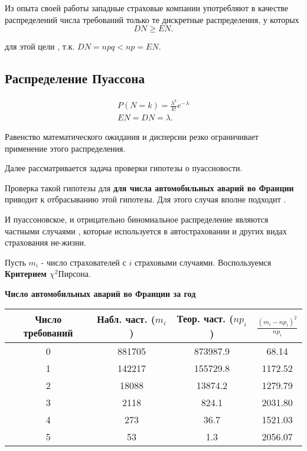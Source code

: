 \begin{fact}
	Из опыта своей работы западные страховые компании употребляют в качестве распределений числа требований только те дискретные распределения, у которых
	\[ DN \geq EN. \]
\end{fact}

 для этой цели , т.к. $DN = npq < np = EN.$ 

\subsection{Распределение Пуассона} %
\begin{gather*}
	P(N=k) = \frac{\lambda^k}{k!}e^{-\lambda} \\
	EN = DN = \lambda.
\end{gather*}

Равенство математического ожидания и дисперсии резко ограничивает применение этого распределения.

Далее рассматривается задача проверки гипотезы о пуассновости.

Проверка такой гипотезы для \textbf{ для числа автомобильных аварий во Франции } приводит к отбрасыванию этой гипотезы. Для этого случая вполне подходит . 

И пуассоновское, и отрицательно биномиальное распределение являются частными случаями , которые используется в автостраховании и других видах страхования не-жизни.

Пусть $m_i$ - число страхователей с $i$ страховыми случаями. Воспользуемся \textbf{ Критерием $\chi^2 Пирсона$}.
\begin{center}
\textbf{Число автомобильных аварий во Франции за год}
	\begin{tabular}{ |c|c|c|c|} 
	 \hline
	 Число требований & Набл. част. ($m_i$) & Теор. част. ($np_i$) & $\frac{(m_i-np_i)^2}{np_i}$ \\
	 \hline 
	 0 & 881705 & 873987.9 & 68.14 \\ 
	 \hline
	 1 & 142217 & 155729.8 & 1172.52\\ 
	 \hline
	 2 & 18088 & 13874.2 & 1279.79\\ 
	 \hline
	 3 & 2118 & 824.1 & 2031.80\\ 
	 \hline
	 4 & 273 & 36.7 & 1521.03\\ 
	 \hline
	 5 & 53 & 1.3 & 2056.07\\ 
	 \hline
	\end{tabular}
\end{center}

